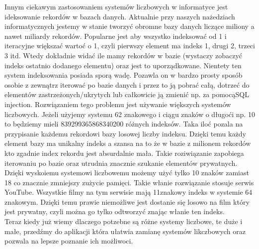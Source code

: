 \documentclass[11pt,a4paper]{article}
\begin{document}
Innym ciekawym zastosowaniem systemów liczbowych w informatyce jest ideksowanie rekordów w bazach danych. Aktualnie przy naszych nażedziach informatycznych jestemy w stanie tworzyć obromne bazy danych liczące miliony a nawet miliardy rekordów. Popularne jest aby wszystko indeksować od 1 i iteracyjne większać wartoć o 1, czyli pierwszy element ma indeks 1, drugi 2, trzeci 3 itd. Wtedy dokładnie widać ile mamy rekordów w bazie (wystaczy zobaczyć indeks ostatnio dodanego elementu) oraz jest to uporządkowane. Nientety ten system indeksowania posiada sporą wadę. Pozawla on w bardzo prosty sposób osobie z zewnątrz iterować po bazie danych i przez to ją pobrać całą, dotrzeć do elementów zastrzeżonych/ukrytych lub całkowicie ją zmienić np. za pomocąSQL injection. Rozwiązaniem tego problemu jest używanie większych systemów liczbowych. Jeżeli użyjemy systemu 62 znakowego i ciągu znaków o długoći np. 10 to będziemy mieli 839299365868340200 różnych indeksów. Taka iloć pozala na przypisanie każdemu rekordowi bazy losowej liczby indeksu. Dzięki temu każdy element bazy ma unikalny indeks a szansa na to że w bazie z milionem rekordów kto zgadnie index rekordu jest absurdalnie mała. Takie roziwiązanie zapobiega iterowaniu po bazie oraz utrudnia znacznie szukanie elementów prywatnych. Dzięki wyskoiemu systemowi liczbowemu możemy użyć tylko 10 znaków zamiast 18 co znacznie zmniejszy zużycie pamięci. Takie włanie rozwiązanie stosuje serwis YouTube. Wszystkie filmy na tym serwisie mają 11znakowy indeks w systemie 64 znakowym. Dzięki temu prawie niemożliwe jest dostanie się losowo na film który jest prywatny, czyli można go tylko odtworzyć znając włanie ten indeks.\\
Teraz kiedy już wiemy dlaczego potzebne są różne systemy liczbowe, te duże i małe, przedźmy do aplikacji która ułatwia zamianę systemów likczbowych oraz pozwala na lepsze poznanie ich możliwoci.
\end{document}
